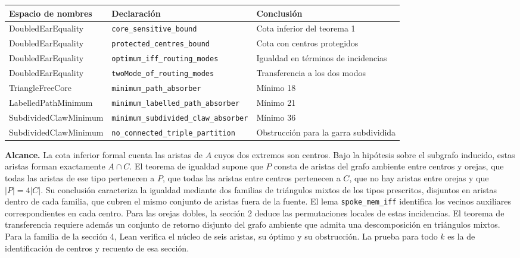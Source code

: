 \documentclass[spanish,11pt,a4paper]{article}
\newcounter{none}
\begin{document}
{\def\LTcaptype{none} %
\begin{longtable}[]{@{}
  >{\raggedright\arraybackslash}p{}
  >{\raggedright\arraybackslash}p{}
  >{\raggedright\arraybackslash}p{}@{}}
\toprule\noalign{}
\begin{minipage}[b]{\linewidth}\raggedright
Espacio de nombres
\end{minipage} & \begin{minipage}[b]{\linewidth}\raggedright
Declaración
\end{minipage} & \begin{minipage}[b]{\linewidth}\raggedright
Conclusión
\end{minipage} \\
\midrule\noalign{}
\endhead
\bottomrule\noalign{}
\endlastfoot
DoubledEarEquality & \texttt{core\_sensitive\_bound} & Cota inferior del teorema 1 \\
DoubledEarEquality & \texttt{protected\_centres\_bound} & Cota con centros protegidos \\
DoubledEarEquality & \texttt{optimum\_iff\_routing\_modes} & Igualdad en términos de incidencias \\
DoubledEarEquality & \texttt{twoMode\_of\_routing\_modes} & Transferencia a los dos modos \\
TriangleFreeCore & \texttt{minimum\_path\_absorber} & Mínimo 18 \\
LabelledPathMinimum & \texttt{minimum\_labelled\_path\_absorber} & Mínimo 21 \\
SubdividedClawMinimum & \texttt{minimum\_subdivided\_claw\_absorber} & Mínimo 36 \\
SubdividedClawMinimum & \texttt{no\_connected\_triple\_partition} & Obstrucción para la garra subdividida \\
\end{longtable}
}

\textbf{Alcance.} La cota inferior formal cuenta las aristas de \(A\) cuyos dos extremos son centros. Bajo la hipótesis sobre el subgrafo inducido, estas aristas forman exactamente \(A\cap C\). El teorema de igualdad supone que \(P\) consta de aristas del grafo ambiente entre centros y orejas, que todas las aristas de ese tipo pertenecen a \(P\), que todas las aristas entre centros pertenecen a \(C\), que no hay aristas entre orejas y que \(|P|=4|C|\). Su conclusión caracteriza la igualdad mediante dos familias de triángulos mixtos de los tipos prescritos, disjuntos en aristas dentro de cada familia, que cubren el mismo conjunto de aristas fuera de la fuente. El lema \texttt{spoke\_mem\_iff} identifica los vecinos auxiliares correspondientes en cada centro. Para las orejas dobles, la sección 2 deduce las permutaciones locales de estas incidencias. El teorema de transferencia requiere además un conjunto de retorno disjunto del grafo ambiente que admita una descomposición en triángulos mixtos. Para la familia de la sección 4, Lean verifica el núcleo de seis aristas, su óptimo y su obstrucción. La prueba para todo \(k\) es la de identificación de centros y recuento de esa sección.
\end{document}
